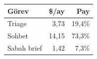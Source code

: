 \begin{tabular}{@{}lrr@{}}
\toprule
\textbf{Görev} & \textbf{\$/ay} & \textbf{Pay} \\
\midrule
Triage & 3,73 & 19,4\% \\
Sohbet & 14,15 & 73,3\% \\
Sabah brief & 1,42 & 7,3\% \\
\bottomrule
\end{tabular}

